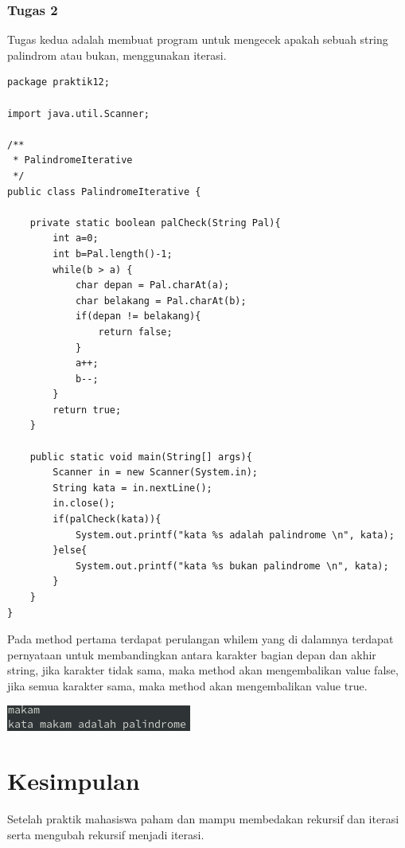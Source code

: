 \documentclass[a4paper,12pt]{article}
\begin{document}
\subsubsection{Tugas 2}
Tugas kedua adalah membuat program untuk mengecek apakah sebuah string palindrom atau bukan, menggunakan iterasi.
\begin{lstlisting}
package praktik12;

import java.util.Scanner;

/**
 * PalindromeIterative
 */
public class PalindromeIterative {

    private static boolean palCheck(String Pal){
        int a=0;
        int b=Pal.length()-1;
        while(b > a) {
            char depan = Pal.charAt(a);
            char belakang = Pal.charAt(b);
            if(depan != belakang){
                return false;
            }
            a++;
            b--;
        }
        return true;
    }

    public static void main(String[] args){
        Scanner in = new Scanner(System.in);
        String kata = in.nextLine();
        in.close();
        if(palCheck(kata)){
            System.out.printf("kata %s adalah palindrome \n", kata);
        }else{
            System.out.printf("kata %s bukan palindrome \n", kata);
        }
    }
}
\end{lstlisting}
Pada method pertama terdapat perulangan whilem yang di dalamnya terdapat pernyataan untuk membandingkan antara karakter
bagian depan dan akhir string, jika karakter tidak sama, maka method akan mengembalikan value false, jika semua karakter
sama, maka method akan mengembalikan value true.
\begin{center}
    \includegraphics[scale=1]{10.png} 
\end{center}

\newpage

\section{Kesimpulan}
Setelah praktik mahasiswa paham dan mampu membedakan rekursif dan iterasi serta mengubah rekursif menjadi iterasi.
\end{document}
